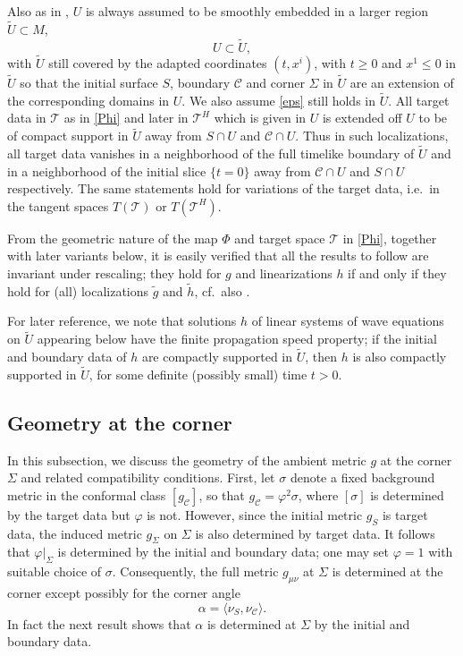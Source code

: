 \documentclass[10pt]{amsart}
\renewcommand{\a}{\alpha}
\newcommand{\f}{\varphi}
\newcommand{\s}{\sigma}
\newcommand{\Si}{\Sigma}
\newcommand{\cC}{{\mathcal C}}
\newcommand{\cT}{{\mathcal T}}
\newcommand{\be}{\begin{equation}}
\newcommand{\ee}{\end{equation}}
\newcommand{\<}{\langle}
\renewcommand{\>}{\rangle}
\newcommand{\w}{\widetilde}
\theoremstyle{plain}
\theoremstyle{remark}
\theoremstyle{definition}
\numberwithin{equation}{section}
\begin{document}
   Also as in \cite{I}, $U$ is always assumed to be smoothly embedded in a larger region $\w U \subset M$,  
$$U \subset \w U,$$
with $\w U$ still covered by the adapted coordinates $(t, x^i)$, with $t \geq 0$ and $x^1 \leq 0$ in $\w U$ so that the initial surface $S$, boundary 
$\cC$ and corner $\Si$ in $\w U$ are an extension of the corresponding domains in $U$. We also assume \eqref{eps} still holds in $\w U$. 
All target data in $\cT$ as in \eqref{Phi} and later in $\cT^H$ which is given in $U$ is extended off $U$ to be of compact support in $\w U$ away 
from $S\cap U$ and $\cC \cap U$. Thus in such localizations, all target data vanishes in a neighborhood of the full timelike boundary of $\w U$ and in 
a neighborhood of the initial slice $\{t = 0\}$ away from $\cC \cap U$ and $S \cap U$ respectively. The same statements hold for variations of the 
target data, i.e.~in the tangent spaces $T(\cT)$ or $T(\cT^H)$. 

  From the geometric nature of the map $\Phi$ and target space $\cT$ in \eqref{Phi}, together with later variants below, it is easily verified that all the results 
  to follow are invariant under rescaling; they hold for $g$ and linearizations $h$ if and only if they hold for (all) localizations $\w g$ and $\w h$, 
  cf.~also \cite{I}. 

   For later reference, we note that solutions $h$ of linear systems of wave equations on $\w U$ appearing below have the finite propagation speed 
property; if the initial and boundary data of $h$ are compactly supported in $\w U$, then $h$ is also compactly supported in $\w U$, for some definite 
(possibly small) time $t > 0$. 

\subsection{Geometry at the corner}

  In this subsection, we discuss the geometry of the ambient metric $g$ at the corner $\Si$ and related compatibility conditions. First, let 
$\s$ denote a fixed background metric in the conformal class $[g_{\cC}]$, so that $g_{\cC} = \f^2 \s$, where $[\s]$ is determined by 
the target data but $\f$ is not. However, since the initial metric $g_S$ is target data, the induced metric $g_{\Si}$ on $\Si$ is also 
determined by target data. It follows that $\f |_{\Si}$ is determined by the initial and boundary data; one may set $\f = 1$ with suitable choice 
of $\s$. Consequently, the full metric $g_{\mu\nu}$ at $\Si$ is determined at the corner except possibly for the corner angle 
\be \label{angle}
\a = \<\nu_S, \nu_{\cC}\>.
\ee
In fact the next result shows that $\a$ is determined at $\Si$ by the initial and boundary data. 
\end{document}
